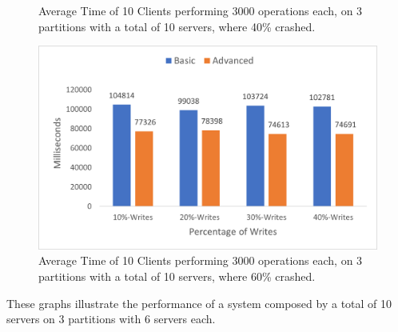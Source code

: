 \documentclass[times, 10pt,twocolumn]{article}
\begin{document}
\begin{figure}[h!]
	\caption{Average Time of 10 Clients performing 3000 operations each, on 3 partitions with a total of 10 servers, where 40\% crashed.}
	\vspace{0.15in}
	\centering
	\includegraphics[scale=0.65]{Graphs/Client-10-60.png}
	\caption{Average Time of 10 Clients performing 3000 operations each, on 3 partitions with a total of 10 servers, where 60\% crashed.}
\end{figure}
These graphs illustrate the performance of a system composed by a total of 10 servers on 3 partitions with 6 servers each.
\end{document}
